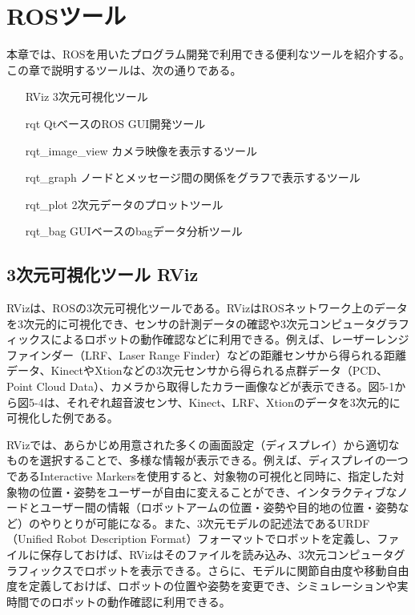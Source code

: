 
\chapter{ROSツール}

本章では、ROSを用いたプログラム開発で利用できる便利なツールを紹介する。この章で説明するツールは、次の通りである。\\

\begin{itemize}
 \begin{itemize}
 \item [RViz] 3次元可視化ツール
 \item [rqt] QtベースのROS GUI開発ツール
 \item [rqt\_image\_view] カメラ映像を表示するツール
 \item [rqt\_graph] ノードとメッセージ間の関係をグラフで表示するツール
 \item [rqt\_plot] 2次元データのプロットツール
 \item [rqt\_bag] GUIベースのbagデータ分析ツール
 \end{itemize}
\end{itemize}

\section{3次元可視化ツール RViz}

RVizは、ROSの3次元可視化ツールである。RVizはROSネットワーク上のデータを3次元的に可視化でき、センサの計測データの確認や3次元コンピュータグラフィックスによるロボットの動作確認などに利用できる。例えば、レーザーレンジファインダー（LRF、Laser Range Finder）などの距離センサから得られる距離データ、KinectやXtionなどの3次元センサから得られる点群データ（PCD、Point Cloud Data）、カメラから取得したカラー画像などが表示できる。図5-1から図5-4は、それぞれ超音波センサ、Kinect、LRF、Xtionのデータを3次元的に可視化した例である。

RVizでは、あらかじめ用意された多くの画面設定（ディスプレイ）から適切なものを選択することで、多様な情報が表示できる。例えば、ディスプレイの一つであるInteractive Markersを使用すると、対象物の可視化と同時に、指定した対象物の位置・姿勢をユーザーが自由に変えることができ、インタラクティブなノードとユーザー間の情報（ロボットアームの位置・姿勢や目的地の位置・姿勢など）のやりとりが可能になる。また、3次元モデルの記述法であるURDF（Unified Robot Description Format）フォーマットでロボットを定義し、ファイルに保存しておけば、RVizはそのファイルを読み込み、3次元コンピュータグラフィックスでロボットを表示できる。さらに、モデルに関節自由度や移動自由度を定義しておけば、ロボットの位置や姿勢を変更でき、シミュレーションや実時間でのロボットの動作確認に利用できる。


